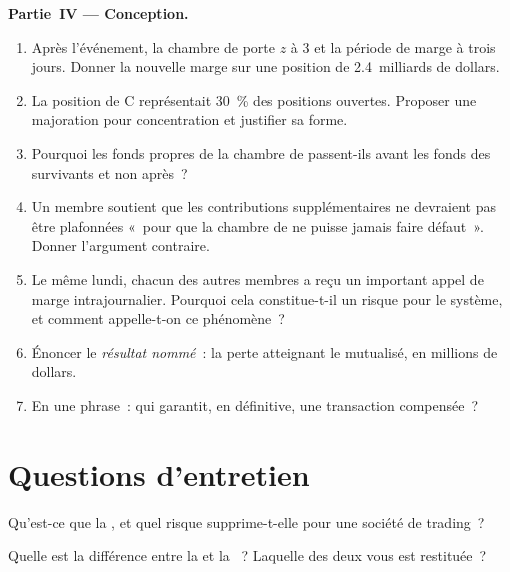 \begin{problem}
\medskip\noindent\textbf{Partie~IV --- Conception.}
\begin{enumerate}[resume]
\item Après l'événement, la chambre de  porte $z$ à 3 et la période de
marge à trois jours. Donner la nouvelle marge sur une position de 2.4~milliards de dollars.
\item La position de C représentait 30~\% des positions ouvertes. Proposer une
majoration pour concentration et justifier sa forme.
\item Pourquoi les fonds propres de la chambre de  passent-ils avant
les fonds des survivants et non après~?
\item Un membre soutient que les contributions supplémentaires ne devraient pas être plafonnées «~pour que la
chambre de  ne puisse jamais faire défaut~». Donner l'argument contraire.
\item Le même lundi, chacun des autres membres a reçu un important
appel de marge intrajournalier. Pourquoi cela constitue-t-il un risque pour le système, et comment
appelle-t-on ce phénomène~?
\item Énoncer le \emph{résultat nommé}~: la perte atteignant le  mutualisé, en millions de dollars.
\item En une phrase~: qui garantit, en définitive, une transaction compensée~?
\end{enumerate}
\end{problem}

\section{Questions d'entretien}

\begin{interviewq}\label{iq:m1:clearing-and-settlement:1}
Qu'est-ce que la , et quel risque supprime-t-elle pour une société de trading~?
\end{interviewq}

\begin{interviewq}\label{iq:m1:clearing-and-settlement:2}
Quelle est la différence entre la  et la ~? Laquelle
des deux vous est restituée~?
\end{interviewq}

